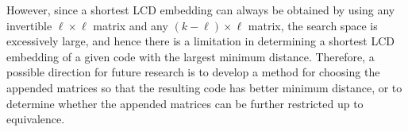 \documentclass{article}
\theoremstyle{definition}
\theoremstyle{remark}
\begin{document}
However, since a shortest LCD embedding can always be obtained by using any invertible $\ell \times \ell$ matrix and any $(k-\ell)\times \ell$ matrix, the search space is excessively large, and hence there is a limitation in determining a shortest LCD embedding of a given code with the largest minimum distance. Therefore, a possible direction for future research is to develop a method for choosing the appended matrices so that the resulting code has better minimum distance, or to determine whether the appended matrices can be further restricted up to equivalence.








\end{document}
